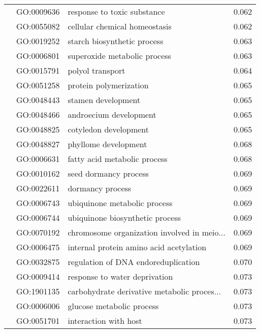 \begin{longtable}{lllr}
   & GO:0009636 &                  response to toxic substance &         0.062 \\
   & GO:0055082 &                cellular chemical homeostasis &         0.062 \\
   & GO:0019252 &                  starch biosynthetic process &         0.063 \\
   & GO:0006801 &                 superoxide metabolic process &         0.063 \\
   & GO:0015791 &                             polyol transport &         0.064 \\
   & GO:0051258 &                       protein polymerization &         0.065 \\
   & GO:0048443 &                           stamen development &         0.065 \\
   & GO:0048466 &                       androecium development &         0.065 \\
   & GO:0048825 &                        cotyledon development &         0.065 \\
   & GO:0048827 &                         phyllome development &         0.068 \\
   & GO:0006631 &                 fatty acid metabolic process &         0.068 \\
   & GO:0010162 &                        seed dormancy process &         0.069 \\
   & GO:0022611 &                             dormancy process &         0.069 \\
   & GO:0006743 &                 ubiquinone metabolic process &         0.069 \\
   & GO:0006744 &              ubiquinone biosynthetic process &         0.069 \\
   & GO:0070192 &  chromosome organization involved in meio... &         0.069 \\
   & GO:0006475 &      internal protein amino acid acetylation &         0.069 \\
   & GO:0032875 &          regulation of DNA endoreduplication &         0.070 \\
   & GO:0009414 &                response to water deprivation &         0.073 \\
   & GO:1901135 &  carbohydrate derivative metabolic proces... &         0.073 \\
   & GO:0006006 &                    glucose metabolic process &         0.073 \\
   & GO:0051701 &                        interaction with host &         0.073 \\

\end{longtable}

